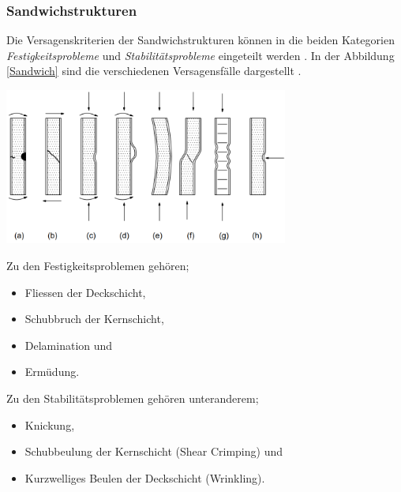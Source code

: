   \subsubsection{Sandwichstrukturen}
  Die Versagenskriterien der Sandwichstrukturen können in die beiden Kategorien \emph{Festigkeitsprobleme} und \emph{Stabilitätsprobleme} eingeteilt werden \cite{ETH}. In der Abbildung \ref{Sandwich} sind die verschiedenen Versagensfälle dargestellt \cite{Sandwich}.

  \begin{center}
    \includegraphics[width=0.7\textwidth]{04_Figures/Sandwich.png}
    \label{Sandwich}
  \end{center}

  Zu den Festigkeitsproblemen gehören;
  \begin{itemize}
    \item Fliessen der Deckschicht,
    \item Schubbruch der Kernschicht,
    \item Delamination und
    \item Ermüdung.
  \end{itemize}

  Zu den Stabilitätsproblemen gehören unteranderem;
  \begin{itemize}
    \item Knickung,
    \item Schubbeulung der Kernschicht (Shear Crimping) und
    \item Kurzwelliges Beulen der Deckschicht (Wrinkling).\\
  \end{itemize}

